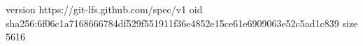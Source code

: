 version https://git-lfs.github.com/spec/v1
oid sha256:6f06c1a7168666784df529f551911f36e4852e15ce61e6909063e52c5ad1c839
size 5616
